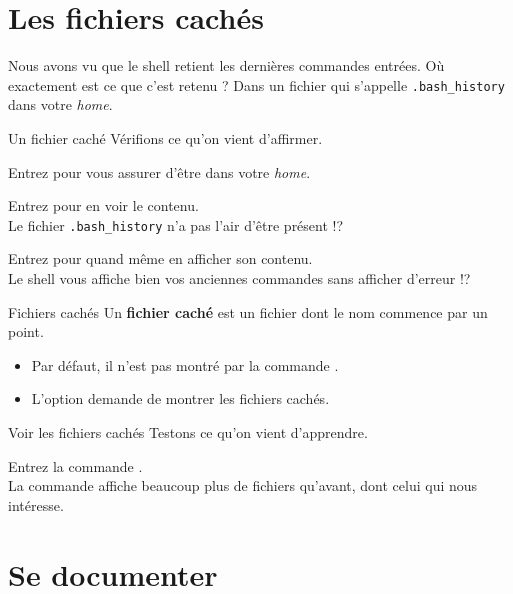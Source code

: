 \documentclass[a4paper,11pt]{style-esi/td}
\begin{document}
\section{Les fichiers cachés}

	Nous avons vu que le shell retient les dernières commandes entrées.
	Où exactement est ce que c'est retenu ?
	Dans un fichier qui s'appelle \verb|.bash_history| dans votre \emph{home}.

	\begin{Experience}{Un fichier caché}
		Vérifions ce qu'on vient d'affirmer.
		\begin{steps}
		\item Entrez  pour vous assurer d'être dans votre \emph{home}.
		\item Entrez  pour en voir le contenu.
			\\Le fichier \verb|.bash_history| n'a pas l'air d'être présent !?
		\item Entrez  pour quand même en afficher son contenu.
			\\Le shell vous affiche bien vos anciennes commandes sans afficher d'erreur !?
		\end{steps}
	\end{Experience}

	\medskip
	\begin{theorie}{Fichiers cachés}
		Un \textbf{fichier caché} 
		est un fichier dont le nom commence par un point.
		\begin{itemize}
		\item Par défaut, il n'est pas montré par la commande \kbd{ls}.
		\item L'option  demande de montrer les fichiers cachés.
		\end{itemize}
	\end{theorie}

	\begin{Experience}{Voir les fichiers cachés}
		Testons ce qu'on vient d'apprendre.
		\begin{steps}
		\item Entrez la commande \kbd{ls -a}.
			\\La commande affiche beaucoup plus de fichiers qu'avant,
			dont celui qui nous intéresse.
		\end{steps}
	\end{Experience}

\section{Se documenter}
\end{document}
